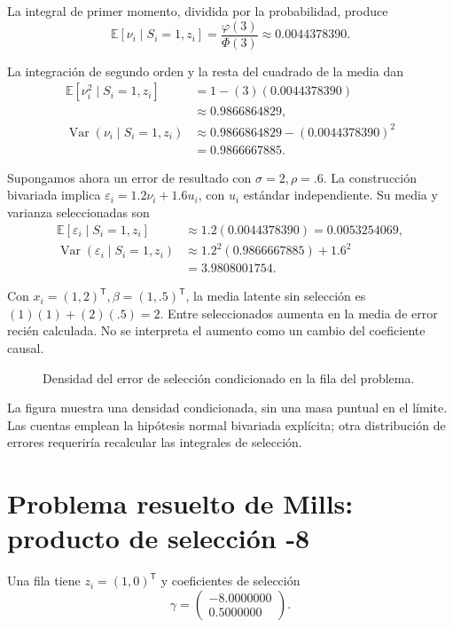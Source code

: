 \documentclass[11pt,a4paper]{article}
\newcommand{\E}{\mathbb E}
\newcommand{\T}{^{\mathsf T}}
\DeclareMathOperator{\Var}{Var}
\begin{document}
La integral de primer momento, dividida
por la probabilidad, produce
\[
\E[\nu_i\mid S_i=1,z_i]
=\frac{\varphi(3)}{\Phi(3)}
\approx0.0044378390.
\]

La integración de segundo orden y
la resta del cuadrado de la media dan
\[
\begin{aligned}
\E[\nu_i^2\mid S_i=1,z_i]&=1-(3)(0.0044378390)\\
&\approx0.9866864829,\\
\Var(\nu_i\mid S_i=1,z_i)&\approx0.9866864829-(0.0044378390)^2\\
&=0.9866667885.\end{aligned}
\]

Supongamos ahora un error de resultado con
\(\sigma=2,\rho=.6\).
La construcción bivariada implica
\(\varepsilon_i=1.2\nu_i+1.6u_i\),
con \(u_i\) estándar independiente.
Su media y varianza seleccionadas son
\[
\begin{aligned}
\E[\varepsilon_i\mid S_i=1,z_i]&\approx1.2(0.0044378390)
=0.0053254069,\\
\Var(\varepsilon_i\mid S_i=1,z_i)&\approx1.2^2(0.9866667885)+1.6^2\\
&=3.9808001754.\end{aligned}
\]

Con \(x_i=(1,2)\T,\beta=(1,.5)\T\),
la media latente sin selección es
\((1)(1)+(2)(.5)=2\).
Entre seleccionados aumenta en
la media de error recién calculada.
No se interpreta el aumento como
un cambio del coeficiente causal.


\begin{figure}[H]\centering
{}
\caption{Densidad del error de selección condicionado en la fila del problema.}
\end{figure}

La figura muestra una densidad condicionada,
sin una masa puntual en el límite.
Las cuentas emplean la hipótesis
normal bivariada explícita;
otra distribución de errores requeriría
recalcular las integrales de selección.

\clearpage
\section{Problema resuelto de Mills: producto de selección -8}\label{unidad83}
Una fila tiene \(z_i=(1,0)\T\)
y coeficientes de selección
\[
\gamma=\begin{pmatrix}-8.0000000\\0.5000000\end{pmatrix}.
\]
\end{document}
